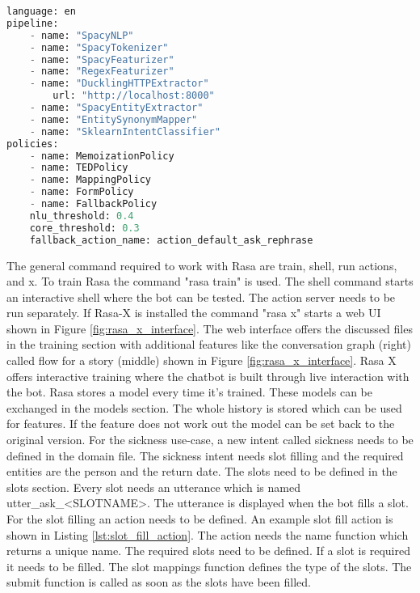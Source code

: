 \begin{lstlisting}[caption={Rasa Configuration}, label={lst:rasa_config},captionpos=b,frame=single,language={Python},commentstyle=\color{mygreen},keywordstyle=\color{blue},
    morekeywords={language, pipeline, policies, name}]                
language: en
pipeline: 
    - name: "SpacyNLP"
    - name: "SpacyTokenizer"
    - name: "SpacyFeaturizer"
    - name: "RegexFeaturizer"
    - name: "DucklingHTTPExtractor"
        url: "http://localhost:8000"
    - name: "SpacyEntityExtractor"
    - name: "EntitySynonymMapper"
    - name: "SklearnIntentClassifier"
policies:
    - name: MemoizationPolicy
    - name: TEDPolicy
    - name: MappingPolicy
    - name: FormPolicy
    - name: FallbackPolicy
    nlu_threshold: 0.4
    core_threshold: 0.3
    fallback_action_name: action_default_ask_rephrase
\end{lstlisting} 
The general command required to work with Rasa are train, shell, run actions, and x.
To train Rasa the command "rasa train" is used. 
The shell command starts an interactive shell where the bot can be tested.
The action server needs to be run separately.
If Rasa-X is installed the command "rasa x" starts a web UI shown in Figure \ref{fig:rasa_x_interface}.
The web interface offers the discussed files in the training section with additional
features like the conversation graph (right) called flow for a story (middle) shown in Figure \ref{fig:rasa_x_interface}.
Rasa X offers interactive training where the chatbot is built through live interaction 
with the bot. 
Rasa stores a model every time it's trained.
These models can be exchanged in the models section.
The whole history is stored which can be used for features.
If the feature does not work out the model can be set back to 
the original version.
For the sickness use-case, a new intent called sickness needs to be defined in the 
domain file.
The sickness intent needs slot filling and the required entities are the 
person and the return date. 
The slots need to be defined in the slots section.
Every slot needs an utterance which is named utter\_ask\_<SLOTNAME>.
The utterance is displayed when the bot fills a slot.
For the slot filling an action needs to be defined.
An example slot fill action is shown in Listing \ref{lst:slot_fill_action}.
The action needs the name function which returns a unique name.
The required slots need to be defined.
If a slot is required it needs to be filled.
The slot mappings function defines the type of the slots.
The submit function is called as soon as the slots have been filled.
